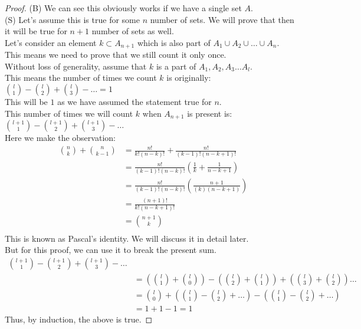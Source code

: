 \begin{proof}
    (B) We can see this obviously works if we have a single set $A$.\\
    (S) Let's assume this is true for some $n$ number of sets. We will prove that then it will be true for $n+1$ number of sets as well.\\
    Let's consider an element $k \subset A_{n+1}$ which is also part of $A_1 \cup A_2 \cup \dots \cup A_n$.\\
    This means we need to prove that we still count it only once.\\
    Without loss of generality, assume that $k$ is a part of $A_1, A_2, A_3 \dots A_l$.\\
    This means the number of times we count $k$ is originally:\\
    $\binom{l}{1}-\binom{l}{2}+\binom{l}{3}-\dots=1$\\
    This will be $1$ as we have assumed the statement true for $n$.\\
    This number of times we will count $k$ when $A_{n+1}$ is present is:\\
    $\binom{l+1}{1}-\binom{l+1}{2}+\binom{l+1}{3}-\dots$\\
    Here we make the observation:\\
    \begin{align*}
        \binom{n}{k}+\binom{n}{k-1} & = \frac{n!}{k!(n-k)!}+ \frac{n!}{(k-1)!(n-k+1)!}\\
        & = \frac{n!}{(k-1)!(n-k)!}\left( \frac{1}{k}+\frac{1}{n-k+1} \right)\\
        & = \frac{n!}{(k-1)!(n-k)!}\left( \frac{n+1}{(k)(n-k+1)} \right)\\
        & = \frac{(n+1)!}{k!(n-k+1)!}\\
        & = \binom{n+1}{k}\\
    \end{align*}
    This is known as Pascal's identity. We will discuss it in detail later.\\
    But for this proof, we can use it to break the present sum.\\
\begin{align*}
\binom{l+1}{1}-\binom{l+1}{2}+\binom{l+1}{3}-\dots & \\
&= \left(\binom{l}{1}+\binom{l}{0}\right)-\left(\binom{l}{2}+\binom{l}{1}\right)+\left(\binom{l}{3}+\binom{l}{2}\right)\dots\\
&= \binom{l}{0}+\left( \binom{l}{1}-\binom{l}{2}+\dots \right)-\left( \binom{l}{1}-\binom{l}{2}+\dots \right)\\
&= 1+1-1=1
\end{align*}
Thus, by induction, the above is true.
\end{proof}
